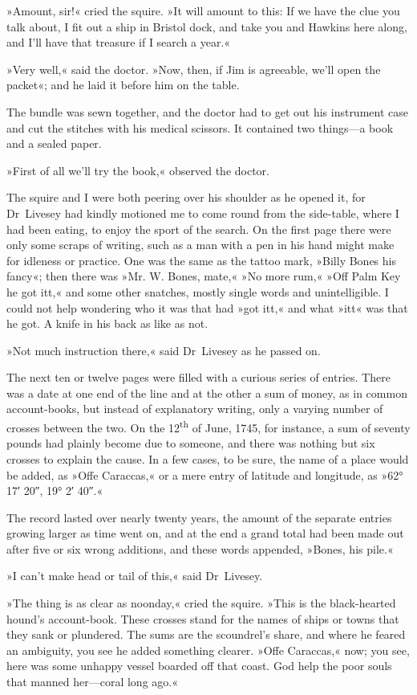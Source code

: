 »Amount, sir!« cried the squire. »It will amount to this: If we have the clue you talk about, I fit out a ship in Bristol dock, and take you and Hawkins here along, and I'll have that treasure if I search a year.«

»Very well,« said the doctor. »Now, then, if Jim is agreeable, we'll open the packet«; and he laid it before him on the table.

The bundle was sewn together, and the doctor had to get out his instrument case and cut the stitches with his medical scissors. It contained two things—a book and a sealed paper.

»First of all we'll try the book,« observed the doctor.

The squire and I were both peering over his shoulder as he opened it, for Dr~Livesey had kindly motioned me to come round from the side-table, where I had been eating, to enjoy the sport of the search. On the first page there were only some scraps of writing, such as a man with a pen in his hand might make for idleness or practice. One was the same as the tattoo mark, »Billy Bones his fancy«; then there was »Mr. W. Bones, mate,« »No more rum,« »Off Palm Key he got itt,« and some other snatches, mostly single words and unintelligible. I could not help wondering who it was that had »got itt,« and what »itt« was that he got. A knife in his back as like as not.

»Not much instruction there,« said Dr~Livesey as he passed on.

The next ten or twelve pages were filled with a curious series of entries. There was a date at one end of the line and at the other a sum of money, as in common account-books, but instead of explanatory writing, only a varying number of crosses between the two. On the 12\textsuperscript{th} of June, 1745, for instance, a sum of seventy pounds had plainly become due to someone, and there was nothing but six crosses to explain the cause. In a few cases, to be sure, the name of a place would be added, as »Offe Caraccas,« or a mere entry of latitude and longitude, as »62° 17′ 20″, 19° 2′ 40″.«

The record lasted over nearly twenty years, the amount of the separate entries growing larger as time went on, and at the end a grand total had been made out after five or six wrong additions, and these words appended, »Bones, his pile.«

»I can't make head or tail of this,« said Dr~Livesey.

»The thing is as clear as noonday,« cried the squire. »This is the black-hearted hound's account-book. These crosses stand for the names of ships or towns that they sank or plundered. The sums are the scoundrel's share, and where he feared an ambiguity, you see he added something clearer. »Offe Caraccas,« now; you see, here was some unhappy vessel boarded off that coast. God help the poor souls that manned her—coral long ago.«

